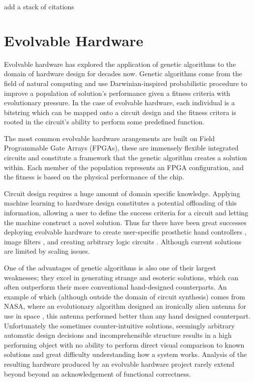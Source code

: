 \todo add a stack of citations

\section{Evolvable Hardware}
Evolvable hardware has explored the application of genetic algorithms to
the domain of hardware design for decades now. Genetic algorithms come from the field of natural
computing and use Darwinian-inspired probabilistic procedure to improve a population
of solution's
performance given a fitness criteria with evolutionary pressure. In the case of evolvable hardware,
each individual is a bitstring which can be mapped onto a circuit design
and the fitness critera is rooted
in the circuit's ability to perform some predefined function.

The most common evolvable hardware arangements
are built on Field Programmable Gate Arrays (FPGAs), these are immensely
flexible integrated circuits and constitute a framework that the genetic
algorithm creates a solution within. Each member of the population
represents an FPGA configuration, and the fitness is based on the
physical performance of the chip.

Circuit design requires a huge amount of domain specific knowledge.
Applying machine learning to hardware design constitutes a potential
offloading of this information, allowing a user to define the success
criteria for a circuit and letting the machine construct a novel solution.
Thus far there have been great successes deploying evolvable hardware to
create user-specific prosthetic hand controllers \cite{Kajitani1999AnEH},
image filters \cite{HybridFilter}, and creating arbitrary logic circuits
 \cite{Vasicek2011}. Although current solutions are limited by scaling
issues.

One of the advantages of genetic algorithms is also one of their largest
weaknesses; they excel in generating strange and esoteric solutions,
which can often outperform their more conventional hand-designed counterparts.
An example of which (although outside the domain of circuit synthesis)
comes from NASA, where an evolutionary algorithm designed an ironically
alien antenna for use in space \cite{Antenna}, this antenna performed better
than any hand designed counterpart.
Unfortunately the sometimes counter-intuitive solutions, seemingly arbitrary
automatic design decisions and incomprehensible structure results in a high
performing object with no ability to perform direct
visual comparison to known solutions and great difficulty understanding how a system
works. Analysis of the resulting hardware produced by an evolvable hardware project rarely
extend beyond beyond an acknowledgement of functional correctness.

